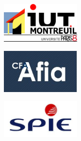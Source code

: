 \begin{titlepage}
\begin{center}
\begin{minipage}[t]{0.30\textwidth}
  \begin{flushleft}
    \includegraphics [width=40mm]{images/logo-univ.jpg} \\[0.5cm]
  \end{flushleft}
\end{minipage}
\begin{minipage}[t]{0.30\textwidth}
  \begin{center}
    \includegraphics [width=40mm]{images/logo-cfa.jpg} \\[0.5cm]
  \end{center}
\end{minipage}
\begin{minipage}[t]{0.30\textwidth}
  \begin{flushright}
    \includegraphics [width=40mm]{images/logo-societe2.jpg} \\[0.5cm]
  \end{flushright}
\end{minipage} \\[1.5cm]

\vspace{2cm}

\textsc{\Large \reportsubject}\\[0.5cm]
\HRule \\[0.4cm]
{\huge \bfseries \reporttitle}\\[0.4cm]
\HRule \\[1.5cm]





\end{center}
\end{titlepage}
